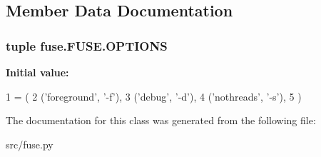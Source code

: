 \subsection{Member Data Documentation}
\hypertarget{classfuse_1_1FUSE_a7efd0e8f258fe7ed74a331d98f7541d7}{
\subsubsection[{O\-P\-T\-I\-O\-N\-S}]{\setlength{\rightskip}{0pt plus 5cm}tuple fuse.\-F\-U\-S\-E.\-O\-P\-T\-I\-O\-N\-S\hspace{0.3cm}{\ttfamily [static]}}}\label{classfuse_1_1FUSE_a7efd0e8f258fe7ed74a331d98f7541d7}
{\bfseries Initial value\-:}
\begin{DoxyCode}
1 = (
2         (\textcolor{stringliteral}{'foreground'}, \textcolor{stringliteral}{'-f'}),
3         (\textcolor{stringliteral}{'debug'}, \textcolor{stringliteral}{'-d'}),
4         (\textcolor{stringliteral}{'nothreads'}, \textcolor{stringliteral}{'-s'}),
5     )
\end{DoxyCode}


The documentation for this class was generated from the following file\-:\begin{DoxyCompactItemize}
\item 
src/fuse.\-py\end{DoxyCompactItemize}
